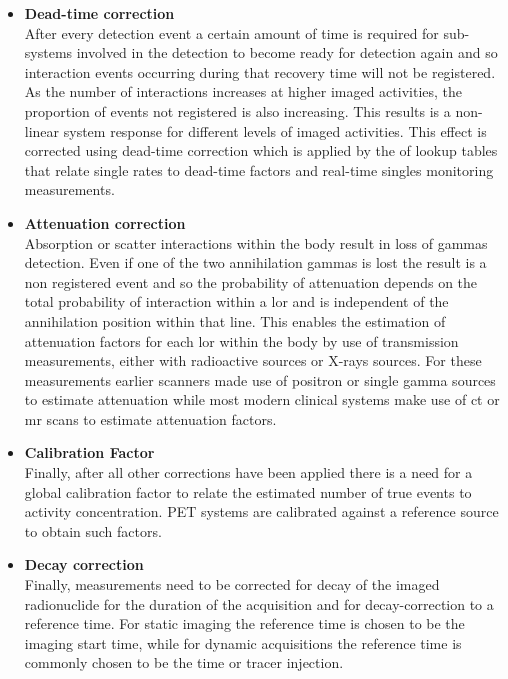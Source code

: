 \begin{itemize}
\item\textbf{Dead-time correction}\\
After every detection event a certain amount of time is required for sub-systems involved in the detection to become ready for detection again and so interaction events occurring during that recovery time will not be registered. As the number of interactions increases at higher imaged activities, the proportion of events not registered is also increasing. This results is a non-linear system response for different levels of imaged activities. This effect is corrected using dead-time correction which is applied by the of lookup tables that relate single rates to dead-time factors and real-time singles monitoring measurements.
\item\textbf{Attenuation correction}\\
Absorption or scatter interactions within the body result in loss of gammas detection. Even if one of the two annihilation gammas is lost the result is a non registered event and so the probability of attenuation depends on the total probability of interaction within a \gls{lor} and is independent of the annihilation position within that line. This enables the estimation of attenuation factors for each \gls{lor} within the body by use of transmission measurements, either with radioactive sources or X-rays sources. For these measurements earlier scanners made use of positron or single gamma sources to estimate attenuation while most modern clinical systems make use of \gls{ct} or \gls{mr} scans to estimate attenuation factors. 
\item\textbf{Calibration Factor}\\
Finally, after all other corrections have been applied there is a need for a global calibration factor to relate the estimated number of true events to activity concentration. 
PET systems are calibrated against a reference source to obtain such factors. 
\item\textbf{Decay correction}\\
Finally, measurements need to be corrected for decay of the imaged radionuclide for the duration of the acquisition and for decay-correction to a reference time. 
For static imaging the reference time is chosen to be the imaging start time, while for dynamic acquisitions the reference time is commonly chosen to be the time or tracer injection. 
\end{itemize}

